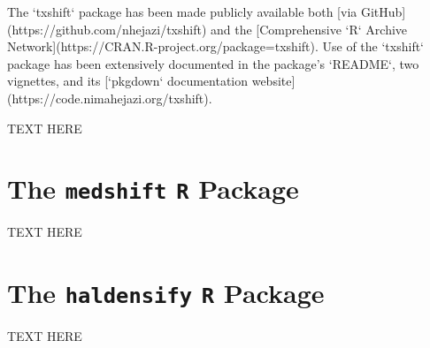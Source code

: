 The `txshift` package has been made publicly available both [via
GitHub](https://github.com/nhejazi/txshift) and the [Comprehensive `R` Archive
Network](https://CRAN.R-project.org/package=txshift). Use of the `txshift`
package has been extensively documented in the package's `README`, two
vignettes, and its [`pkgdown` documentation
website](https://code.nimahejazi.org/txshift).

TEXT HERE

\section{The \texttt{medshift} \texttt{R} Package}

TEXT HERE

\section{The \texttt{haldensify} \texttt{R} Package}

TEXT HERE
